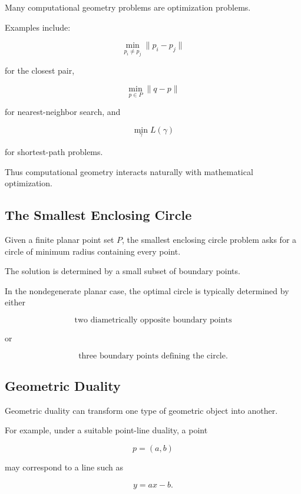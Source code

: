 Many computational geometry problems are optimization problems.

Examples include:

\[
\boxed{
\min_{p_i\neq p_j}
\|p_i-p_j\|
}
\]

for the closest pair,

\[
\boxed{
\min_{p\in P}
\|q-p\|
}
\]

for nearest-neighbor search, and

\[
\boxed{
\min_{\gamma}
L(\gamma)
}
\]

for shortest-path problems.

Thus computational geometry interacts naturally with mathematical
optimization.

\subsection{The Smallest Enclosing Circle}
\label{subsec:smallest-enclosing-circle}

Given a finite planar point set \(P\), the smallest enclosing circle problem
asks for a circle of minimum radius containing every point.

The solution is determined by a small subset of boundary points.

In the nondegenerate planar case, the optimal circle is typically determined
by either

\[
\boxed{
\text{two diametrically opposite boundary points}
}
\]

or

\[
\boxed{
\text{three boundary points defining the circle}.
}
\]

\subsection{Geometric Duality}
\label{subsec:computational-geometric-duality}

Geometric duality can transform one type of geometric object into another.

For example, under a suitable point-line duality, a point

\[
p=(a,b)
\]

may correspond to a line such as

\[
\boxed{
y=ax-b.
}
\]

